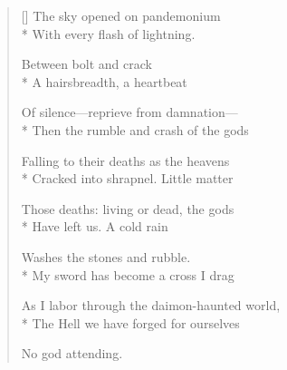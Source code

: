 \label{ch:lear_bc}
\settowidth{\versewidth}{As I labor through the daimon-haunted world,}
\begin{verse}[\versewidth]
The sky opened on pandemonium\\*
With every flash of lightning.

Between bolt and crack\\*
A hairsbreadth, a heartbeat

Of silence---reprieve from damnation---\\*
Then the rumble and crash of the gods

Falling to their deaths as the heavens\\*
Cracked into shrapnel.   Little matter

Those deaths: living or dead, the gods\\*
Have left us.    A cold rain

Washes the stones and rubble.\\*
My sword has become a cross I drag

As I labor through the daimon-haunted world,\\*
The Hell we have forged for ourselves

No god attending.
\end{verse}
